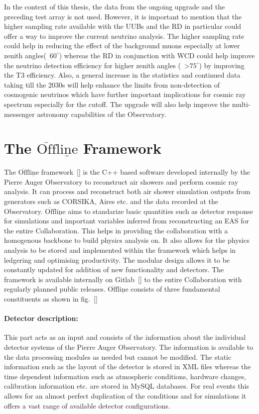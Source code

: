 In the context of this thesis, the data from the ongoing upgrade and the preceding test array is not used. However, it is important to mention that the higher sampling rate available with the UUBs and the RD in particular could offer a way to improve the current neutrino analysis. The higher sampling rate could help in reducing the effect of the background muons especially at lower zenith angles(~$60^{\circ}$) whereas the RD in conjunction with WCD could help improve the neutrino detection efficiency for higher zenith angles (~>$75^{\circ}$) by improving the T3 efficiency. Also, a general increase in the statistics and continued data taking till the 2030s will help enhance the limits from non-detection of cosmogenic neutrinos which have further important implications for cosmic ray spectrum especially for the cutoff. The upgrade will also help improve the multi-messenger astronomy capabilities of the Observatory. 


\section{The $\mathrm{\overline{Off}\underline{line}}$ Framework}
\label{sec:Offline}
The $\mathrm{\overline{Off}\underline{line}}$ framework~\ref{} is the C++ based software developed internally by the Pierre Auger Observatory to reconstruct air showers and perform cosmic ray analysis. It can process and reconstruct both air shower simulation outputs from generators such as CORSIKA, Aires etc. and the data recorded at the Observatory. $\mathrm{\overline{Off}\underline{line}}$ aims to standarize basic quantities such as detector response for simulations and important variables inferred from reconstructing an EAS for the entire Collaboration. This helps in providing the collaboration with a homogenous backbone to build physics analysis on. It also allows for the physics analysis to be stored and implemented within the framework which helps in ledgering and optimising productivity. The modular design allows it to be constantly updated for addition of new functionality and detectors. The framework is available internally on Gitlab~\ref{} to the entire Collaboration with regularly planned public releases. $\mathrm{\overline{Off}\underline{line}}$ consists of three fundamental constituents as shown in fig.~\ref{}

\paragraph*{Detector description:}
This part acts as an input and consists of the information about the individual detector systems of the Pierre Auger Observatory. The information is available to the data processing modules as needed but cannot be modified. The static information such as the layout of the detector is stored in XML files whereas the time dependent information such as atmospheric conditions, hardware changes, calibration information etc. are stored in MySQL databases. For real events this allows for an almost perfect duplication of the conditions and for simulations it offers a vast range of available detector configurations.  


